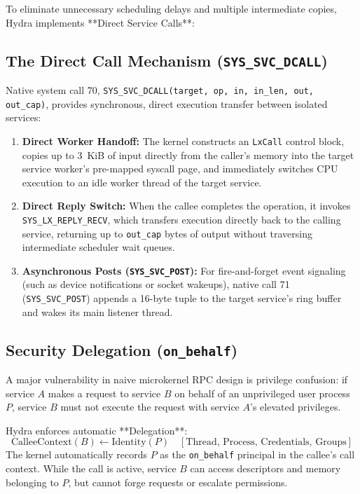 To eliminate unnecessary scheduling delays and multiple intermediate copies, Hydra implements **Direct Service Calls**:

\subsection{The Direct Call Mechanism (\texttt{SYS\_SVC\_DCALL})}
Native system call 70, \texttt{SYS\_SVC\_DCALL(target, op, in, in\_len, out, out\_cap)}, provides synchronous, direct execution transfer between isolated services:
\begin{enumerate}
    \item \textbf{Direct Worker Handoff:} The kernel constructs an \texttt{LxCall} control block, copies up to 3~KiB of input directly from the caller's memory into the target service worker's pre-mapped syscall page, and immediately switches CPU execution to an idle worker thread of the target service.
    \item \textbf{Direct Reply Switch:} When the callee completes the operation, it invokes \texttt{SYS\_LX\_REPLY\_RECV}, which transfers execution directly back to the calling service, returning up to \texttt{out\_cap} bytes of output without traversing intermediate scheduler wait queues.
    \item \textbf{Asynchronous Posts (\texttt{SYS\_SVC\_POST}):} For fire-and-forget event signaling (such as device notifications or socket wakeups), native call 71 (\texttt{SYS\_SVC\_POST}) appends a 16-byte tuple to the target service's ring buffer and wakes its main listener thread.
\end{enumerate}

\subsection{Security Delegation (\texttt{on\_behalf})}
A major vulnerability in naive microkernel RPC design is privilege confusion: if service $A$ makes a request to service $B$ on behalf of an unprivileged user process $P$, service $B$ must not execute the request with service $A$'s elevated privileges.

Hydra enforces automatic **Delegation**:
\begin{equation}
\text{CalleeContext}(B) \longleftarrow \text{Identity}(P) \quad [\text{Thread, Process, Credentials, Groups}]
\end{equation}
The kernel automatically records $P$ as the \texttt{on\_behalf} principal in the callee's call context. While the call is active, service $B$ can access descriptors and memory belonging to $P$, but cannot forge requests or escalate permissions.

